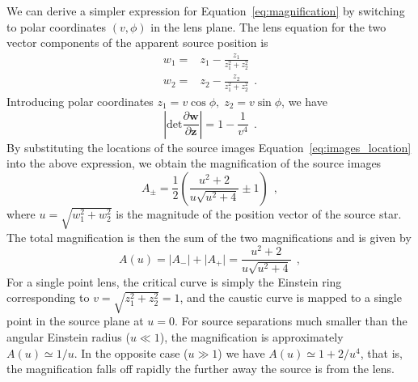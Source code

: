 \documentclass[12pt,dvipsnames]{report}
\newcommand{\hquad}{~~}
\begin{document}
We can derive a simpler expression for Equation~\ref{eq:magnification} by
switching to polar coordinates $(v,\phi)$ in the lens plane. The lens equation
for the two vector components of the apparent source position is 
\begin{align}
    w_1= & z_1- \frac{z_1}{z_1^2+z_2^2} \\
    w_2= & z_2- \frac{z_2}{z_1^2+z_2^2}
    \hquad.
\end{align}
Introducing polar coordinates $z_1=v\cos\phi,\;z_2=v\sin\phi$, we have
\begin{equation}
    \left\lvert\textrm{det}
    \frac{\partial \mathbf w}{\partial \mathbf z} \right\rvert =1- \frac{1}{v^4}
    \hquad.
\end{equation}
By substituting the locations of the source images
Equation~\ref{eq:images_location} into the
above expression, we obtain the magnification of the source images
\begin{equation}
    A_\pm = \frac{1}{2}\left(\frac{u^{2}+2}{u \sqrt{u^{2}+4}} \pm 1\right)
    \hquad,
    \label{eq:magnification_per_image}
\end{equation}
where $u = \sqrt{w_1^2+w_2^2}$ is the magnitude of the position
vector of the source star.
The total magnification is then the sum of the two magnifications and is given by
\citep{1936Sci....84..506E}
\begin{equation}
    A(u)=\lvert A_-\rvert+\lvert A_+\rvert= \frac{u^2+2}{u\sqrt{u^2+4}}
    \hquad,
    \label{eq:magnification_point_lens}
\end{equation}
For a single point lens, the critical curve is simply the Einstein
ring corresponding to $v=\sqrt{z_1^2+z_2^2}=1$, and the caustic curve is mapped to 
a single point in the source plane at $u=0$.
For source separations much smaller than the angular Einstein radius ($u\ll 1$), the
magnification is approximately $A(u)\simeq 1/u$. In the opposite case ($u\gg 1$)
we have $A(u)\simeq 1+ 2/u^4$, that is, the magnification falls off rapidly the further
away the source is from the lens.
\end{document}

